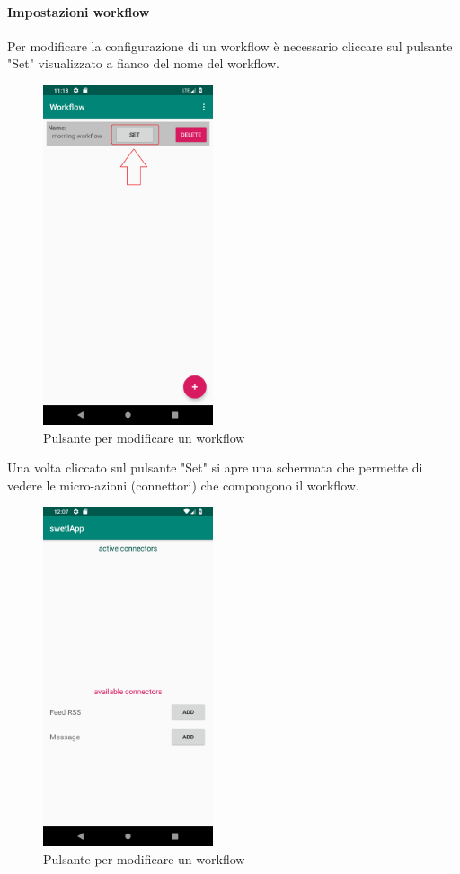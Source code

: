 \paragraph{Impostazioni workflow}
\label{sec:sec_impostazioni_workflow}
Per modificare la configurazione di un workflow è necessario cliccare sul pulsante "Set" visualizzato a fianco del nome del workflow.
\begin{figure}[H]
	\centering
	\includegraphics[width=5cm]{../includes/pics/set_button_workflow.png}
	\caption{\label{fig:set_button_workflow}Pulsante per modificare un workflow}
\end{figure}
\pagebreak
Una volta cliccato sul pulsante "Set" si apre una schermata che permette di vedere le micro-azioni (connettori) che compongono il workflow.
\begin{figure}[H]
	\centering
	\includegraphics[width=5cm]{../includes/pics/edit_workflow.png}
	\caption{\label{fig:edit_workflow}Pulsante per modificare un workflow}
\end{figure}
